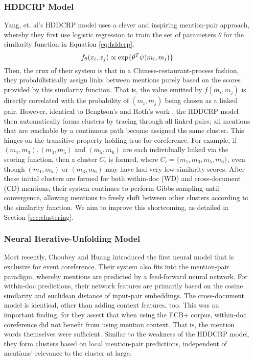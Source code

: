 \documentclass[11pt,a4paper]{article}
\begin{document}
\subsubsection{HDDCRP Model}
\label{sec:HDDCRP}
Yang, et. al's HDDCRP model  uses a clever and inspiring mention-pair approach, whereby they first use logistic regression to train the set of parameters $\theta$ for the similarity function in Equation \ref{eq:hddcrp}.  
\begin{equation}
\label{eq:hddcrp}
f_{\theta}(x_i,x_j) \propto \textnormal{exp\{} \theta^T\psi(m_i,m_j)\textnormal{\}}
\end{equation}
Then, the crux of their system is that in a Chinese-restaurant-process fashion, they probabilistically assign links between mentions purely based on the scores provided by this similarity function.  That is, the value emitted by $f(m_i,m_j)$ is directly correlated with the probability of $(m_i,m_j)$ being chosen as a linked pair.  However, identical to Bengtson's and Roth's work \cite{Bengtson:2008:UVF:1613715.1613756}, the HDDCRP model then automatically forms clusters by tracing through all linked pairs; all mentions that are reachable by a continuous path become assigned the same cluster.  This hinges on the transitive property holding true for coreference.  For example, if ${(m_1,m_3),(m_3,m_5)}$ and $(m_5,m_6)$ are each individually linked via the scoring function, then a cluster $C_i$ is formed, where $C_i = \{m_1,m_3,m_5,m_6\}$, even though $(m_1,m_5)$ or $(m_3,m_6)$ may have had very low similarity scores.  After these initial clusters are formed for both within-doc (WD) and cross-document (CD) mentions, their system continues to perform Gibbs sampling until convergence, allowing mentions to freely shift between other clusters according to the similarity function.  We aim to improve this shortcoming, as detailed in Section \ref{sec:clustering}.

\subsubsection{Neural Iterative-Unfolding Model}
\label{sec:Choubey}
Most recently, Choubey and Huang  introduced the first neural model that is exclusive for event coreference.  Their system also fits into the mention-pair paradigm, whereby mentions are predicted by a feed-forward neural network. For within-doc predictions, their network features are primarily based on the cosine similarity and euclidean distance of input-pair embeddings.  The cross-document model is identical, other than adding context features, too.  This was an important finding, for they assert that when using the ECB+ corpus, within-doc coreference did not benefit from using mention context.  That is, the mention words themselves were sufficient.  Similar to the weakness of the HDDCRP model, they form clusters based on local mention-pair predictions, independent of mentions' relevance to the cluster at large.
\end{document}
